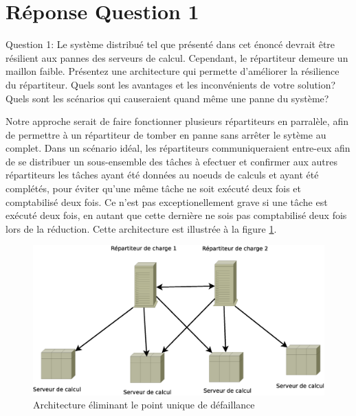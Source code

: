 \section{Réponse Question 1}
Question 1: Le système distribué tel que présenté dans cet énoncé devrait être résilient aux pannes
des serveurs de calcul. Cependant, le répartiteur demeure un maillon faible. Présentez une
architecture qui permette d'améliorer la résilience du répartiteur. Quels sont les avantages et les
inconvénients de votre solution? Quels sont les scénarios qui causeraient quand même une panne du
système?

Notre approche serait de faire fonctionner plusieurs répartiteurs en parralèle, afin de permettre à 
un répartiteur de tomber en panne sans arrêter le sytème au complet. Dans un scénario idéal, les répartiteurs 
communiqueraient entre-eux afin de se distribuer un sous-ensemble des tâches à efectuer et confirmer aux autres répartiteurs 
les tâches ayant été données au noeuds de calculs et ayant été complétés, pour éviter qu'une même tâche ne soit exécuté deux fois
et comptabilisé deux fois. Ce n'est pas exceptionellement grave si une tâche est exécuté deux fois, en autant que cette dernière ne sois 
pas comptabilisé deux fois lors de la réduction. Cette architecture est illustrée à la figure  \ref{fig:arch_2}.

\begin{figure}
  \includegraphics[width=\linewidth]{Arch_2.eps}
  \caption{Architecture éliminant le point unique de défaillance}
  \label{fig:arch_2}
\end{figure}



